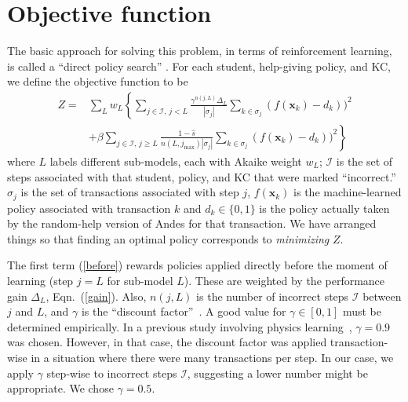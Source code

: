 \documentclass{edm_template}
\begin{document}
\section{Objective function}

The basic approach for solving this problem, in terms of reinforcement
learning, is called a ``direct policy search'' \cite{rosenstein_robot_2001}.
For each student, help-giving policy, and KC, we define the objective 
function to be 
%
\begin{subequations}
  \label{objective}
  \begin{align}
  Z =& \sum_L w_L \left\{\sum_{j \in \mathcal{I},\,j<L}  
       \frac{\gamma^{n(j,L)} \Delta_L}{\left|\sigma_j\right|}
  \sum_{k\in \sigma_j} \left(f(\mathbf{x}_k)-d_k\right))^2 \right.
     \label{before} \\
  &+\beta \left. \sum_{j \in \mathcal{I},\,j \ge L} \frac{1-\hat{s}}
      {n(L,j_\mathrm{max})\left|\sigma_j\right|}
             \sum_{k\in \sigma_j} \left(f(\mathbf{x}_k)-d_k\right))^2
     \right\}
  \label{after}
  \end{align}
\end{subequations}
%
where $L$ labels different sub-models, each with Akaike weight $w_L$;
$\mathcal{I}$ is the set of steps associated
with that student, policy, and KC that were marked ``incorrect.''  
$\sigma_j$ is the set of transactions associated with step $j$,
$f(\mathbf{x}_k)$ is the machine-learned policy associated
with transaction $k$ and
$d_k\in \{0,1\}$ is the
policy actually taken by the random-help version of Andes for that 
transaction.
We have arranged things so that finding an optimal policy 
corresponds to {\em minimizing} $Z$.

The first term (\ref{before}) rewards policies applied directly before
the moment of learning (step $j=L$ for sub-model $L$).  
These are weighted by the performance gain $\Delta_L$, Eqn.~(\ref{gain}).
Also, $n(j,L)$ is the number
of incorrect steps $\mathcal{I}$ between $j$ and $L$, 
and $\gamma$ is the ``discount factor''~\cite{russell_artificial_2002}. 
A good value for $\gamma \in [0,1]$ must be determined empirically.
In a previous study involving physics learning~\cite{chi_empirically_2011}, 
$\gamma=0.9$ was chosen.
However, in that case, the discount factor was applied transaction-wise in 
a situation where there were many transactions per step.  In our case, 
we apply $\gamma$ step-wise to incorrect steps $\mathcal{I}$, 
suggesting a lower number might be appropriate.  We chose $\gamma=0.5$.
\end{document}
